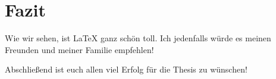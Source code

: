 
\newpage
\section{Fazit}
Wie wir sehen, ist \LaTeX{} ganz schön toll. Ich jedenfalls würde es meinen Freunden und meiner Familie empfehlen!

Abschließend ist euch allen viel Erfolg für die Thesis zu wünschen!
